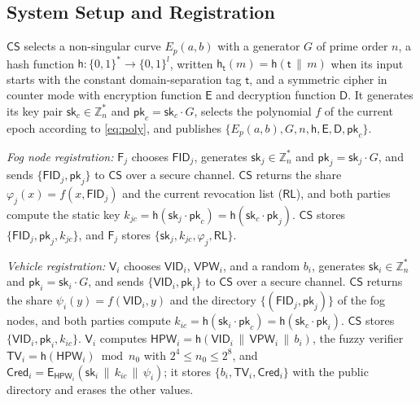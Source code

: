 \documentclass[journal]{IEEEtran}
\theoremstyle{plain}
\theoremstyle{definition}
\newcommand{\Veh}{\mathsf{V}}            %
\newcommand{\Fog}{\mathsf{F}}            %
\newcommand{\CS}{\mathsf{CS}}            %
\newcommand{\VID}{\mathsf{VID}}          %
\newcommand{\FID}{\mathsf{FID}}          %
\newcommand{\VPW}{\mathsf{VPW}}          %
\newcommand{\HPW}{\mathsf{HPW}}          %
\newcommand{\TV}{\mathsf{TV}}            %
\newcommand{\Cred}{\mathsf{Cred}}        %
\newcommand{\RL}{\mathsf{RL}}            %
\newcommand{\h}{\mathsf{h}}              %
\newcommand{\hT}[1]{\h_{\mathsf{#1}}}     %
\newcommand{\Enc}{\mathsf{E}}            %
\newcommand{\Dec}{\mathsf{D}}            %
\newcommand{\sk}{\mathsf{sk}}            %
\newcommand{\pk}{\mathsf{pk}}            %
\newcommand{\cat}{\,\|\,}               %
\begin{document}
\subsection{System Setup and Registration}
$\CS$ selects a non-singular curve $E_p(a,b)$ with a generator $G$ of prime order $n$, a hash function $\h:\{0,1\}^*\rightarrow\{0,1\}^l$, written $\hT{t}(m)=\h(\mathsf{t}\cat m)$ when its input starts with the constant domain-separation tag $\mathsf{t}$, and a symmetric cipher in counter mode with encryption function $\Enc$ and decryption function $\Dec$. It generates its key pair $\sk_c\in\mathbb{Z}_n^*$ and $\pk_c=\sk_c\cdot G$, selects the polynomial $f$ of the current epoch according to \eqref{eq:poly}, and publishes $\{E_p(a,b),G,n,\h,\Enc,\Dec,\pk_c\}$.

\emph{Fog node registration:} $\Fog_j$ chooses $\FID_j$, generates $\sk_j\in\mathbb{Z}_n^*$ and $\pk_j=\sk_j\cdot G$, and sends $\{\FID_j,\pk_j\}$ to $\CS$ over a secure channel. $\CS$ returns the share $\varphi_j(x)=f(x,\FID_j)$ and the current revocation list ($\RL$), and both parties compute the static key $k_{jc}=\h(\sk_j\cdot\pk_c)=\h(\sk_c\cdot\pk_j)$. $\CS$ stores $\{\FID_j,\pk_j,k_{jc}\}$, and $\Fog_j$ stores $\{\sk_j,k_{jc},\varphi_j,\RL\}$.

\emph{Vehicle registration:} $\Veh_i$ chooses $\VID_i$, $\VPW_i$, and a random $b_i$, generates $\sk_i\in\mathbb{Z}_n^*$ and $\pk_i=\sk_i\cdot G$, and sends $\{\VID_i,\pk_i\}$ to $\CS$ over a secure channel. $\CS$ returns the share $\psi_i(y)=f(\VID_i,y)$ and the directory $\{(\FID_j,\pk_j)\}$ of the fog nodes, and both parties compute $k_{ic}=\h(\sk_i\cdot\pk_c)=\h(\sk_c\cdot\pk_i)$. $\CS$ stores $\{\VID_i,\pk_i,k_{ic}\}$. $\Veh_i$ computes $\HPW_i=\h(\VID_i\cat\VPW_i\cat b_i)$, the fuzzy verifier $\TV_i=\h(\HPW_i)\bmod n_0$ with $2^4\le n_0\le 2^8$, and $\Cred_i=\Enc_{\HPW_i}(\sk_i\cat k_{ic}\cat\psi_i)$; it stores $\{b_i,\TV_i,\Cred_i\}$ with the public directory and erases the other values.
\end{document}
